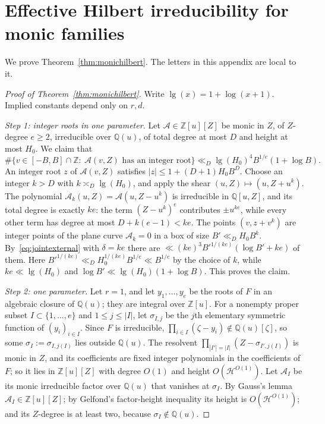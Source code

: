 \documentclass[11pt]{article}
\theoremstyle{definition}
\theoremstyle{remark}
\begin{document}
\section{Effective Hilbert irreducibility for monic families}\label{app:hilbert}

We prove Theorem~\ref{thm:monichilbert}. The letters in this appendix are local to it.

\begin{proof}[Proof of Theorem~\ref{thm:monichilbert}]
Write $\operatorname{lg}(x)=1+\log(x+1)$. Implied constants depend only on $r,d$.

\emph{Step 1: integer roots in one parameter.} Let $\mathcal A\in\mathbb Z[u][Z]$ be
monic in $Z$, of $Z$-degree $e\ge2$, irreducible over $\mathbb Q(u)$, of total
degree at most $D$ and height at most $H_0$. We claim that
\[
 \#\{v\in[-B,B]\cap\mathbb Z:\ \mathcal A(v,Z)\text{ has an integer root}\}
 \ll_D\operatorname{lg}(H_0)^4B^{1/e}(1+\log B).
\]
An integer root $z$ of $\mathcal A(v,Z)$ satisfies $|z|\le1+(D+1)H_0B^D$. Choose an integer
$k>D$ with $k\asymp_D\operatorname{lg}(H_0)$, and apply the shear $(u,Z)\mapsto(u,Z+u^k)$.
The polynomial $\mathcal A_k(u,Z)=\mathcal A(u,Z-u^k)$ is irreducible in $\mathbb Q[u,Z]$, and its
total degree is exactly $ke$: the term $(Z-u^k)^e$ contributes $\pm u^{ke}$,
while every other term has degree at most $D+k(e-1)<ke$. The points
$(v,z+v^k)$ are integer points of the plane curve $\mathcal A_k=0$ in a box of size
$B'\ll_DH_0B^k$. By~\eqref{eq:jointexternal} with $\delta=ke$ there are
$\ll(ke)^3B'^{1/(ke)}(\log B'+ke)$ of them. Here
$B'^{1/(ke)}\ll_DH_0^{1/(ke)}B^{1/e}\ll B^{1/e}$ by the choice of $k$, while
$ke\ll\operatorname{lg}(H_0)$ and $\log B'\ll\operatorname{lg}(H_0)(1+\log B)$. This proves
the claim.

\emph{Step 2: one parameter.} Let $r=1$, and let $y_1,\dots,y_e$ be the roots of
$F$ in an algebraic closure of $\mathbb Q(u)$; they are integral over
$\mathbb Z[u]$. For a nonempty proper subset $I\subset\{1,\dots,e\}$ and
$1\le j\le|I|$, let $\sigma_{I,j}$ be the $j$th elementary symmetric function of
$(y_i)_{i\in I}$. Since $F$ is irreducible, $\prod_{i\in I}(\zeta-y_i)\notin\mathbb Q(u)[\zeta]$,
so some $\sigma_I:=\sigma_{I,j(I)}$ lies outside $\mathbb Q(u)$. The resolvent
$\prod_{|I'|=|I|}(Z-\sigma_{I',j(I)})$ is monic in $Z$, and its coefficients are
fixed integer polynomials in the coefficients of $F$; so it lies in
$\mathbb Z[u][Z]$ with degree $O(1)$ and height $O(\mathcal H^{O(1)})$. Let $\mathcal A_I$ be its
monic irreducible factor over $\mathbb Q(u)$ that vanishes at $\sigma_I$. By
Gauss's lemma $\mathcal A_I\in\mathbb Z[u][Z]$; by Gelfond's factor-height inequality its
height is $O(\mathcal H^{O(1)})$; and its $Z$-degree is at least two, because
$\sigma_I\notin\mathbb Q(u)$.


\end{proof}
\end{document}
